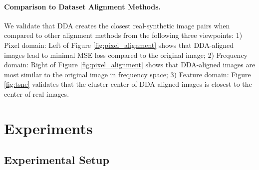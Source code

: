 \documentclass{article}
\begin{document}
\vspace{0pt}
\paragraph{Comparison to Dataset Alignment Methods.} We validate that DDA creates the closest real-synthetic image pairs when compared to other alignment methods from the following three viewpoints: 1) Pixel domain: Left of Figure \ref{fig:pixel_alignment} shows that DDA-aligned images lead to minimal MSE loss compared to the original image; 2) Frequency domain: Right of Figure \ref{fig:pixel_alignment} shows that DDA-aligned images are most similar to the original image in frequency space; 3) Feature domain: Figure \ref{fig:tsne} validates that the cluster center of DDA-aligned images is closest to the center of real images.

\vspace{0pt}
\section{Experiments}
\label{sec:experiments}
\subsection{Experimental Setup}
\vspace{0pt}


\end{document}
